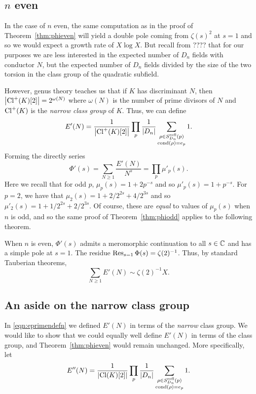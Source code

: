 \subsection{$n$ even}

In the case of $n$ even, the same computation as in the proof of
Theorem~\ref{thm:phieven} will yield a double pole coming from $\zeta(s)^2$ at
$s = 1$ and so we would expect a growth rate of $X \log X$. But recall from
????  that for our purposes we are less interested in the expected number of
$D_n$ fields with conductor $N$, but the expected number of $D_n$ fields
divided by the size of the two torsion in the class group of the quadratic
subfield.

However, genus theory teaches us that if $K$ has discriminant $N$, then $\left|
\operatorname{Cl}^+(K)[2] \right| = 2^{\omega(N)}$ where $\omega(N)$ is the number of prime
divisors of $N$ and $\operatorname{Cl}^+(K)$ is the {\em narrow class group} of $K$. Thus, we can
define
\begin{equation}\label{eqn:eprimendefn}
E'(N) = \frac{1}{\left| \operatorname{Cl}^+(K)[2] \right|} \prod_p \frac{1}{|D_n|} \sum_{\substack{\rho \in S_{D_n}^{\mathrm{refl}}(p) \\ \operatorname{cond}(\rho) = e_p}} 1.
\end{equation}
Forming the directly series
\[ \Phi'(s) = \sum_{N \geq 1} \frac{E'(N)}{N^s} = \prod_p \mu'_p(s). \]
Here we recall that for odd $p$, $\mu_p(s) = 1 + 2p^{-s}$ and so $\mu'_p(s) = 1 + p^{-s}$. For $p = 2$, we have that $\mu_2(s) = 1 + 2/2^{2s} + 4/2^{3s}$ and so $\mu'_2(s) = 1 + 1/2^{2s} + 2/2^{3s}$. Of course, these are {\em equal} to values of $\mu_p(s)$ when $n$ is odd, and so the same proof of Theorem~\ref{thm:phiodd} applies to the following theorem.

\begin{thm}\label{thm:phieven}
  When $n$ is even, $\Phi'(s)$ admits a meromorphic continuation to all $s \in
\mathbb{C}$ and has a simple pole at $s = 1$. The residue $\operatorname{Res}_{s=1}\Phi(s) =
\zeta(2)^{-1}$. Thus, by standard Tauberian theorems,
\[ \sum_{N \geq 1} E'(N) \sim \zeta(2)^{-1} X. \]
\end{thm}


\subsection{An aside on the narrow class group}

In \eqref{eqn:eprimendefn} we defined $E'(N)$ in terms of the {\em narrow}
class group. We would like to show that we could equally well define $E'(N)$ in
terms of the class group, and Theorem~\ref{thm:phieven} would remain unchanged.
More specifically, let
\begin{equation}\label{eqn:eprimendefn}
E''(N) = \frac{1}{\left| \operatorname{Cl}(K)[2] \right|} \prod_p \frac{1}{|D_n|} \sum_{\substack{\rho \in S_{D_n}^{\mathrm{refl}}(p) \\ \operatorname{cond}(\rho) = e_p}} 1.
\end{equation}

